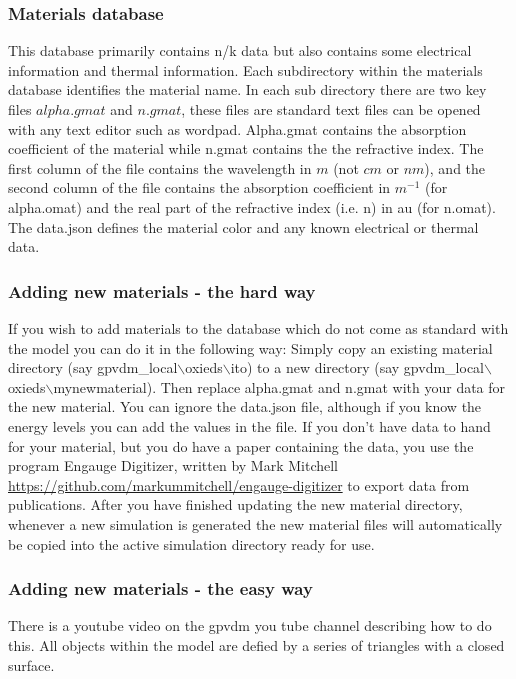 \subsubsection{Materials database}
\label{sec:materialdatabase}
This database primarily contains n/k data but also contains some electrical information and thermal information. Each subdirectory within the materials database identifies the material name.  In each sub directory there are two key files $alpha.gmat$ and $n.gmat$, these files are standard text files can be opened with any text editor such as wordpad.    Alpha.gmat contains the absorption coefficient of the material while n.gmat contains the the refractive index.  The first column of the file contains the wavelength in $m$ (not $cm$ or $nm$), and the second column of the file contains the absorption coefficient in $m^{-1}$ (for alpha.omat) and the real part of the refractive index (i.e. n) in au (for n.omat). The data.json defines the material color and any known electrical or thermal data.


\subsubsection{Adding new materials - the hard way}
If you wish to add materials to the database which do not come as standard with the model you can do it in the following way:  Simply copy an existing material directory (say gpvdm\_local$\backslash$oxieds$\backslash$ito) to a new directory (say gpvdm\_local$\backslash$oxieds$\backslash$mynewmaterial).  Then replace alpha.gmat and n.gmat with your data for the new material. You can ignore the data.json file, although if you know the energy levels you can add the values in the file.
\newline
\newline
If you don't have data to hand for your material, but you do have a paper containing the data, you use the program Engauge Digitizer, written by  Mark Mitchell \url{https://github.com/markummitchell/engauge-digitizer} to export data from publications.  After you have finished updating the new material directory, whenever a new simulation is generated the new material files will automatically be copied into the active simulation directory ready for use. 

\subsubsection{Adding new materials - the easy way}
There is a youtube video on the gpvdm you tube channel describing how to do this. All objects within the model are defied by a series of triangles with a closed surface.


